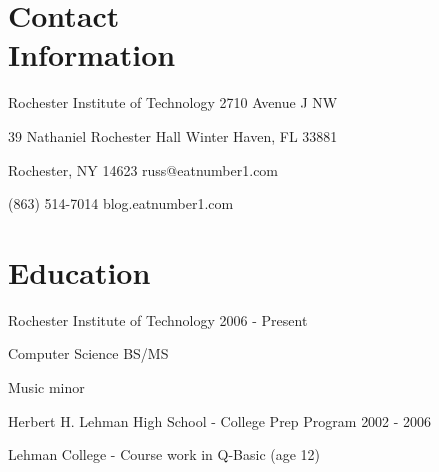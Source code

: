 \documentclass[margin,line]{resume}
\begin{document}
\begin{resume}

\section{\mysidestyle Contact \\ Information}\vspace{2mm}
	\begin{asparablank}
		\item Rochester Institute of Technology \hfill 2710 Avenue J NW
		\item 39 Nathaniel Rochester Hall \hfill Winter Haven, FL 33881
		\item Rochester, NY 14623 \hfill russ@eatnumber1.com
		\item (863) 514-7014 \hfill blog.eatnumber1.com
	\end{asparablank}

\section{\mysidestyle Education}
		\begin{compactdesc}
			\item[Rochester Institute of Technology] \hfill {\footnotesize 2006 - Present}
			\begin{compactitem}
				\item {\small Computer Science BS/MS}
				\item {\small Music minor}
			\end{compactitem}
			\item[Herbert H. Lehman High School] - College Prep Program \hfill
			{\footnotesize 2002 - 2006}
			\item[Lehman College] - Course work in Q-Basic (age 12)
		\end{compactdesc}


\end{resume}
\end{document}
